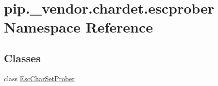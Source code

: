 \hypertarget{namespacepip_1_1__vendor_1_1chardet_1_1escprober}{}\section{pip.\+\_\+vendor.\+chardet.\+escprober Namespace Reference}
\label{namespacepip_1_1__vendor_1_1chardet_1_1escprober}
\subsection*{Classes}
\begin{DoxyCompactItemize}
\item 
class \hyperlink{classpip_1_1__vendor_1_1chardet_1_1escprober_1_1EscCharSetProber}{Esc\+Char\+Set\+Prober}
\end{DoxyCompactItemize}
